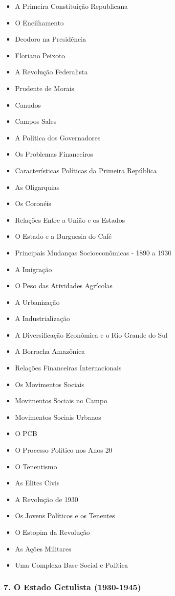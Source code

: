 \documentclass[a4paper,12pt]{article}[abntex2]
\begin{document}
\begin{itemize}
\item A Primeira Constituição Republicana
\item O Encilhamento
\item Deodoro na Presidência
\item Floriano Peixoto
\item A Revolução Federalista
\item Prudente de Morais
\item Canudos
\item Campos Sales
\item A Política dos Governadores
\item Os Problemas Financeiros
\item Características Políticas da Primeira República
\item As Oligarquias
\item Os Coronéis
\item Relações Entre a União e os Estados
\item O Estado e a Burguesia do Café
\item Principais Mudanças Socioeconômicas - 1890 a 1930
\item A Imigração
\item O Peso das Atividades Agrícolas
\item A Urbanização
\item A Industrialização
\item A Diversificação Econômica e o Rio Grande do Sul
\item A Borracha Amazônica
\item Relações Financeiras Internacionais
\item Os Movimentos Sociais
\item Movimentos Sociais no Campo
\item Movimentos Sociais Urbanos
\item O PCB
\item O Processo Político nos Anos 20
\item O Tenentismo
\item As Elites Civis
\item A Revolução de 1930
\item Os Jovens Políticos e os Tenentes
\item O Estopim da Revolução
\item As Ações Militares
\item Uma Complexa Base Social e Política
\end{itemize}
\subsubsection*{7. O Estado Getulista (1930-1945)}
\end{document}
